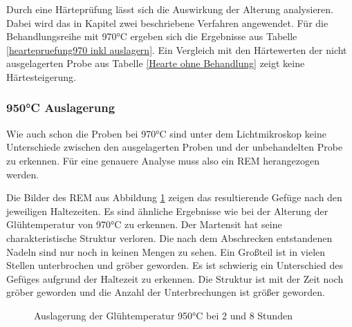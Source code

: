 \documentclass[a4paper, 11pt]{tubsreprt}
\begin{document}
Durch eine Härteprüfung lässt sich die Auswirkung der Alterung analysieren. Dabei wird das in Kapitel zwei beschriebene Verfahren angewendet. Für die Behandlungsreihe mit 970°C ergeben sich die Ergebnisse aus Tabelle \ref{heartepruefung970 inkl auslagern}. Ein Vergleich mit den Härtewerten der nicht ausgelagerten Probe aus Tabelle \ref{Hearte ohne Behandlung} zeigt keine Härtesteigerung. 
\subsubsection{950°C Auslagerung}
Wie auch schon die Proben bei 970°C sind unter dem Lichtmikroskop keine Unterschiede zwischen den ausgelagerten Proben und der unbehandelten Probe zu erkennen. Für eine genauere Analyse muss also ein REM herangezogen werden.

Die Bilder des REM aus Abbildung \ref{REM 950 2 und 8} zeigen das resultierende Gefüge nach den jeweiligen Haltezeiten. Es sind ähnliche Ergebnisse wie bei der Alterung der Glühtemperatur von 970°C zu erkennen. Der Martensit hat seine charakteristische Struktur verloren. Die nach dem Abschrecken entstandenen Nadeln sind nur noch in keinen Mengen zu sehen. Ein Großteil ist in vielen Stellen unterbrochen und gröber geworden. Es ist schwierig ein Unterschied des Gefüges aufgrund der Haltezeit zu erkennen. Die Struktur ist mit der Zeit noch gröber geworden und die Anzahl der Unterbrechungen ist größer geworden.
\begin{figure}
\label{REM 950 2 und 8}
\caption{Auslagerung der Glühtemperatur 950°C bei 2 und 8 Stunden}
\end{figure}
\end{document}
